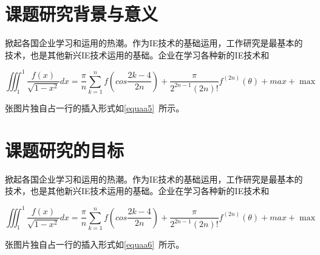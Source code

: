 \chapter{课题研究背景与意义}
掀起各国企业学习和运用的热潮。作为IE技术的基础运用，工作研究是最基本的技术，也是其他新兴IE技术运用的基础。企业在学习各种新的IE技术和\cite{2007}

\begin{equation}
\label{equaa5}
\iiint_1^1\frac{f(x)}{\sqrt{1-x^2}}dx = \frac{\pi}{n}\sum_{k=1}^nf(cos\frac{2k-4}{2n})+\frac{\pi}{2^{2n-1}(2n)!}f^{(2n)}(\theta)+max+\max
\end{equation}

张图片独自占一行的插入形式如\eqref{equaa5}~所示。

\chapter{课题研究的目标}
掀起各国企业学习和运用的热潮。作为IE技术的基础运用，工作研究是最基本的技术，也是其他新兴IE技术运用的基础。企业在学习各种新的IE技术和\cite{2007}

\begin{equation}
\label{equaa6}
\iiint_1^1\frac{f(x)}{\sqrt{1-x^2}}dx = \frac{\pi}{n}\sum_{k=1}^nf(cos\frac{2k-4}{2n})+\frac{\pi}{2^{2n-1}(2n)!}f^{(2n)}(\theta)+max+\max
\end{equation}

张图片独自占一行的插入形式如\eqref{equaa6}~所示。